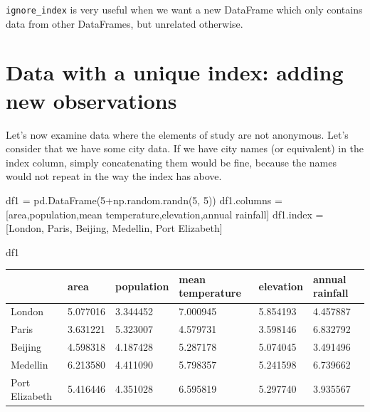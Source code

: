 \documentclass[
  letterpaper,
  DIV=11,
  numbers=noendperiod]{scrreprt}
\newenvironment{Shaded}{\begin{snugshade}}{\end{snugshade}}
\newcommand{\DecValTok}[1]{\textcolor[rgb]{0.68,0.00,0.00}{#1}}
\newcommand{\NormalTok}[1]{\textcolor[rgb]{0.00,0.23,0.31}{#1}}
\newcommand{\OperatorTok}[1]{\textcolor[rgb]{0.37,0.37,0.37}{#1}}
\newcommand{\StringTok}[1]{\textcolor[rgb]{0.13,0.47,0.30}{#1}}
\begin{document}
\texttt{ignore\_index} is very useful when we want a new DataFrame which
only contains data from other DataFrames, but unrelated otherwise.

\hypertarget{data-with-a-unique-index-adding-new-observations}{%
\section{Data with a unique index: adding new
observations}\label{data-with-a-unique-index-adding-new-observations}}

Let's now examine data where the elements of study are not anonymous.
Let's consider that we have some city data. If we have city names (or
equivalent) in the index column, simply concatenating them would be
fine, because the names would not repeat in the way the index has above.

\begin{Shaded}
\begin{Highlighting}[]
\NormalTok{df1 }\OperatorTok{=}\NormalTok{ pd.DataFrame(}\DecValTok{5}\OperatorTok{+}\NormalTok{np.random.randn(}\DecValTok{5}\NormalTok{, }\DecValTok{5}\NormalTok{))}
\NormalTok{df1.columns }\OperatorTok{=}\NormalTok{ [}\StringTok{\textquotesingle{}area\textquotesingle{}}\NormalTok{,}\StringTok{\textquotesingle{}population\textquotesingle{}}\NormalTok{,}\StringTok{\textquotesingle{}mean temperature\textquotesingle{}}\NormalTok{,}\StringTok{\textquotesingle{}elevation\textquotesingle{}}\NormalTok{,}\StringTok{\textquotesingle{}annual rainfall\textquotesingle{}}\NormalTok{]}
\NormalTok{df1.index }\OperatorTok{=}\NormalTok{ [}\StringTok{\textquotesingle{}London\textquotesingle{}}\NormalTok{, }\StringTok{\textquotesingle{}Paris\textquotesingle{}}\NormalTok{, }\StringTok{\textquotesingle{}Beijing\textquotesingle{}}\NormalTok{, }\StringTok{\textquotesingle{}Medellin\textquotesingle{}}\NormalTok{, }\StringTok{\textquotesingle{}Port Elizabeth\textquotesingle{}}\NormalTok{]}
\end{Highlighting}
\end{Shaded}

\begin{Shaded}
\begin{Highlighting}[]
\NormalTok{df1}
\end{Highlighting}
\end{Shaded}

\begin{longtable}[]{@{}llllll@{}}
\toprule()
& area & population & mean temperature & elevation & annual rainfall \\
\midrule()
\endhead
London & 5.077016 & 3.344452 & 7.000945 & 5.854193 & 4.457887 \\
Paris & 3.631221 & 5.323007 & 4.579731 & 3.598146 & 6.832792 \\
Beijing & 4.598318 & 4.187428 & 5.287178 & 5.074045 & 3.491496 \\
Medellin & 6.213580 & 4.411090 & 5.798357 & 5.241598 & 6.739662 \\
Port Elizabeth & 5.416446 & 4.351028 & 6.595819 & 5.297740 & 3.935567 \\
\bottomrule()
\end{longtable}
\end{document}

